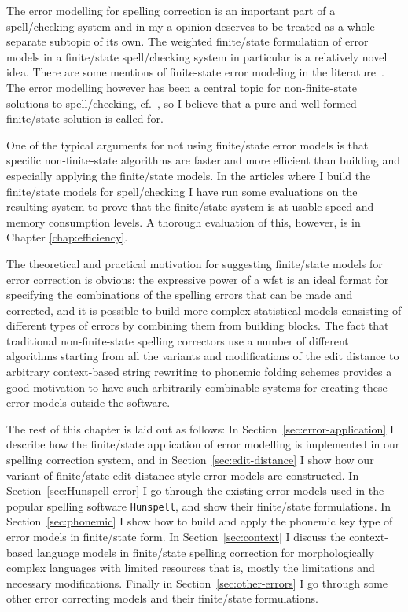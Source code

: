 \documentclass[officiallayout,final]{unihelcompling}
\begin{document}
The error modelling for spelling correction is an important part of a
spell\-/checking system and in my a opinion deserves to be treated as a whole
separate subtopic of its own. The weighted finite\-/state formulation of
\glspl{error model} in a finite\-/state spell\-/checking system in particular
is a relatively novel idea. There are some mentions of finite-state error
modeling in the
literature~\citep{agirre1992xuxen,vannoord2001extendible,agata2002typographical,mohri2003edit}.  The
error modelling however has been a central topic for non-finite-state solutions
to spell\-/checking,
cf.~\citet{kukich1992spelling,mitton2009ordering,deorowicz2005correcting}, so I
believe that a pure and well-formed finite\-/state solution is called for.

One of the typical arguments for not using finite\-/state error models is that
specific non-finite-state algorithms are faster and more efficient than
building and especially applying the finite\-/state models. In the articles
where I build the finite\-/state models for spell\-/checking I have run some
evaluations on the resulting system to prove that the finite\-/state system is
at usable speed and memory consumption levels. A thorough evaluation of this,
however, is in Chapter \ref{chap:efficiency}.

The theoretical and practical motivation for suggesting finite\-/state models
for error correction is obvious: the expressive power of a \gls{wfst} is an
ideal format for specifying the combinations of the spelling errors that can be
made and corrected, and it is possible to build more complex statistical models
consisting of different types of errors by combining them from building blocks.
The fact that traditional non-finite-state spelling correctors use a number of
different algorithms starting from all the variants and modifications of the
edit distance to arbitrary context-based string rewriting to phonemic folding
schemes provides a good motivation to have such arbitrarily combinable systems
for creating these error models outside the software.

The rest of this chapter is laid out as follows: In
Section~\ref{sec:error-application} I describe how the finite\-/state
application of error modelling is implemented in our spelling correction
system, and in Section~\ref{sec:edit-distance} I show how our variant of
finite\-/state edit distance style error models are constructed.  In
Section~\ref{sec:Hunspell-error} I go through the existing error models used in
the popular spelling software \texttt{Hunspell}, and show their finite\-/state
formulations. In Section~\ref{sec:phonemic} I show how to build and apply the
phonemic key type of error models in finite\-/state form.  In
Section~\ref{sec:context} I discuss the context-based language models in
finite\-/state spelling correction for morphologically complex languages with
limited resources that is, mostly the limitations and necessary modifications.
Finally in Section~\ref{sec:other-errors} I go through some other error
correcting models and their finite\-/state formulations.
\end{document}
